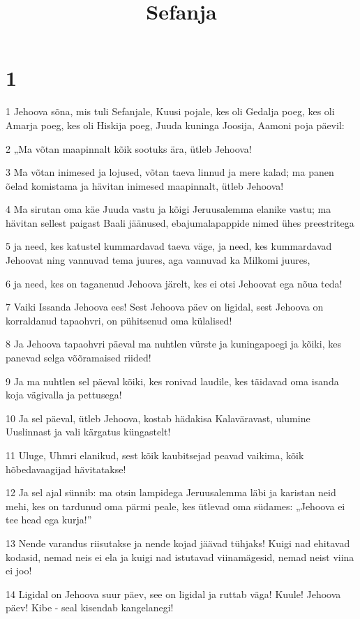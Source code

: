 

\title{Sefanja}

\chapter{1}

\par 1 Jehoova sõna, mis tuli Sefanjale, Kuusi pojale, kes oli Gedalja poeg, kes oli Amarja poeg, kes oli Hiskija poeg, Juuda kuninga Joosija, Aamoni poja päevil:
\par 2 „Ma võtan maapinnalt kõik sootuks ära, ütleb Jehoova!
\par 3 Ma võtan inimesed ja lojused, võtan taeva linnud ja mere kalad; ma panen õelad komistama ja hävitan inimesed maapinnalt, ütleb Jehoova!
\par 4 Ma sirutan oma käe Juuda vastu ja kõigi Jeruusalemma elanike vastu; ma hävitan sellest paigast Baali jäänused, ebajumalapappide nimed ühes preestritega
\par 5 ja need, kes katustel kummardavad taeva väge, ja need, kes kummardavad Jehoovat ning vannuvad tema juures, aga vannuvad ka Milkomi juures,
\par 6 ja need, kes on taganenud Jehoova järelt, kes ei otsi Jehoovat ega nõua teda!
\par 7 Vaiki Issanda Jehoova ees! Sest Jehoova päev on ligidal, sest Jehoova on korraldanud tapaohvri, on pühitsenud oma külalised!
\par 8 Ja Jehoova tapaohvri päeval ma nuhtlen vürste ja kuningapoegi ja kõiki, kes panevad selga võõramaised riided!
\par 9 Ja ma nuhtlen sel päeval kõiki, kes ronivad laudile, kes täidavad oma isanda koja vägivalla ja pettusega!
\par 10 Ja sel päeval, ütleb Jehoova, kostab hädakisa Kalaväravast, ulumine Uuslinnast ja vali kärgatus küngastelt!
\par 11 Uluge, Uhmri elanikud, sest kõik kaubitsejad peavad vaikima, kõik hõbedavaagijad hävitatakse!
\par 12 Ja sel ajal sünnib: ma otsin lampidega Jeruusalemma läbi ja karistan neid mehi, kes on tardunud oma pärmi peale, kes ütlevad oma südames: „Jehoova ei tee head ega kurja!”
\par 13 Nende varandus riisutakse ja nende kojad jäävad tühjaks! Kuigi nad ehitavad kodasid, nemad neis ei ela ja kuigi nad istutavad viinamägesid, nemad neist viina ei joo!
\par 14 Ligidal on Jehoova suur päev, see on ligidal ja ruttab väga! Kuule! Jehoova päev! Kibe - seal kisendab kangelanegi!
